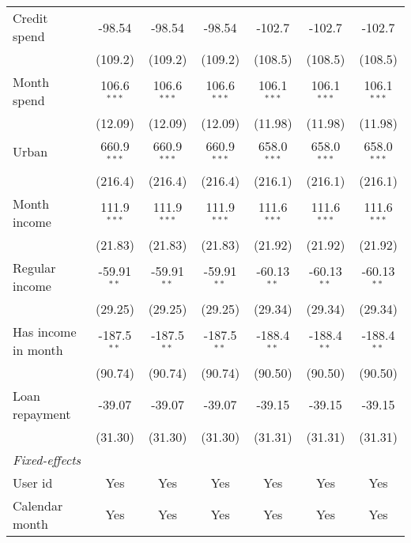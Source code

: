 \begin{table}[htbp]
\begin{threeparttable}[b]
\begin{tabular}{lcccccc}
         Credit spend        & -98.54        & -98.54        & -98.54        & -102.7        & -102.7        & -102.7\\   
                             & (109.2)       & (109.2)       & (109.2)       & (108.5)       & (108.5)       & (108.5)\\   
         Month spend         & 106.6$^{***}$ & 106.6$^{***}$ & 106.6$^{***}$ & 106.1$^{***}$ & 106.1$^{***}$ & 106.1$^{***}$\\   
                             & (12.09)       & (12.09)       & (12.09)       & (11.98)       & (11.98)       & (11.98)\\   
         Urban               & 660.9$^{***}$ & 660.9$^{***}$ & 660.9$^{***}$ & 658.0$^{***}$ & 658.0$^{***}$ & 658.0$^{***}$\\   
                             & (216.4)       & (216.4)       & (216.4)       & (216.1)       & (216.1)       & (216.1)\\   
         Month income        & 111.9$^{***}$ & 111.9$^{***}$ & 111.9$^{***}$ & 111.6$^{***}$ & 111.6$^{***}$ & 111.6$^{***}$\\   
                             & (21.83)       & (21.83)       & (21.83)       & (21.92)       & (21.92)       & (21.92)\\   
         Regular income      & -59.91$^{**}$ & -59.91$^{**}$ & -59.91$^{**}$ & -60.13$^{**}$ & -60.13$^{**}$ & -60.13$^{**}$\\   
                             & (29.25)       & (29.25)       & (29.25)       & (29.34)       & (29.34)       & (29.34)\\   
         Has income in month & -187.5$^{**}$ & -187.5$^{**}$ & -187.5$^{**}$ & -188.4$^{**}$ & -188.4$^{**}$ & -188.4$^{**}$\\   
                             & (90.74)       & (90.74)       & (90.74)       & (90.50)       & (90.50)       & (90.50)\\   
         Loan repayment      & -39.07        & -39.07        & -39.07        & -39.15        & -39.15        & -39.15\\   
                             & (31.30)       & (31.30)       & (31.30)       & (31.31)       & (31.31)       & (31.31)\\   
         \midrule
         \emph{Fixed-effects}\\
         User id             & Yes           & Yes           & Yes           & Yes           & Yes           & Yes\\  
         Calendar month      & Yes           & Yes           & Yes           & Yes           & Yes           & Yes\\  

\end{tabular}
\end{threeparttable}
\end{table}
